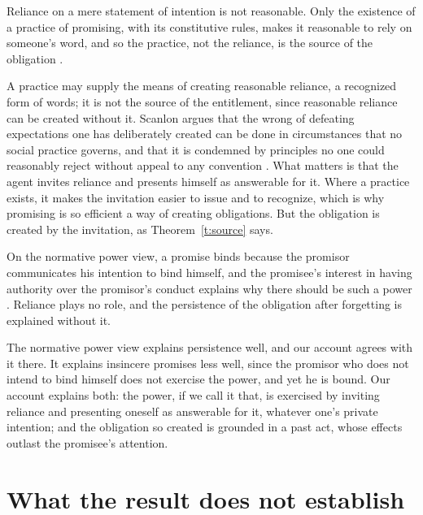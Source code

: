 \documentclass{situationist-preprint}
\begin{document}
\begin{objection}[Convention]
Reliance on a mere statement of intention is not reasonable. Only the existence of a practice of promising, with its constitutive rules, makes it reasonable to rely on someone's word, and so the practice, not the reliance, is the source of the obligation \citep{Rawls1955}.
\end{objection}

\begin{reply}
A practice may supply the means of creating reasonable reliance, a recognized form of words; it is not the source of the entitlement, since reasonable reliance can be created without it. Scanlon argues that the wrong of defeating expectations one has deliberately created can be done in circumstances that no social practice governs, and that it is condemned by principles no one could reasonably reject without appeal to any convention \citep{Scanlon1990}. What matters is that the agent invites reliance and presents himself as answerable for it. Where a practice exists, it makes the invitation easier to issue and to recognize, which is why promising is so efficient a way of creating obligations. But the obligation is created by the invitation, as Theorem~\ref{t:source} says.
\end{reply}

\begin{objection}
On the normative power view, a promise binds because the promisor communicates his intention to bind himself, and the promisee's interest in having authority over the promisor's conduct explains why there should be such a power \citep{Owens2012}. Reliance plays no role, and the persistence of the obligation after forgetting is explained without it.
\end{objection}

\begin{reply}
The normative power view explains persistence well, and our account agrees with it there. It explains insincere promises less well, since the promisor who does not intend to bind himself does not exercise the power, and yet he is bound. Our account explains both: the power, if we call it that, is exercised by inviting reliance and presenting oneself as answerable for it, whatever one's private intention; and the obligation so created is grounded in a past act, whose effects outlast the promisee's attention.
\end{reply}

\section{What the result does not establish}
\end{document}
